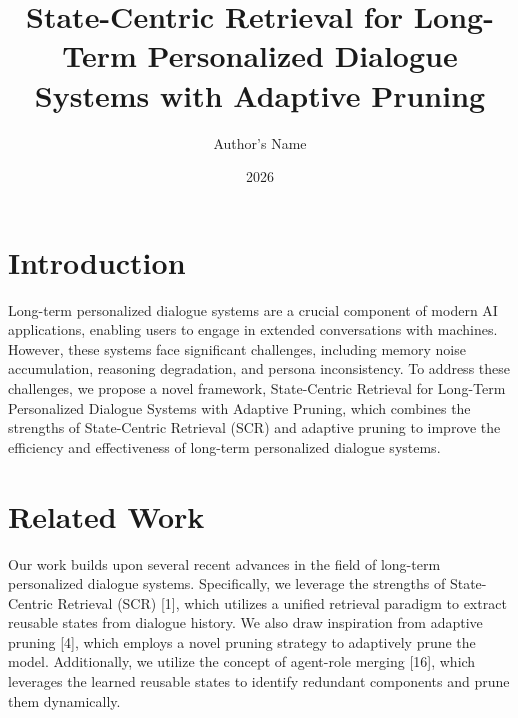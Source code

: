 \documentclass{article}
\title{State-Centric Retrieval for Long-Term Personalized Dialogue Systems with Adaptive Pruning}
\author{Author's Name}
\date{2026}
\begin{document}
\maketitle


\section{Introduction}

Long-term personalized dialogue systems are a crucial component of modern AI applications, enabling users to engage in extended conversations with machines. However, these systems face significant challenges, including memory noise accumulation, reasoning degradation, and persona inconsistency. To address these challenges, we propose a novel framework, State-Centric Retrieval for Long-Term Personalized Dialogue Systems with Adaptive Pruning, which combines the strengths of State-Centric Retrieval (SCR) and adaptive pruning to improve the efficiency and effectiveness of long-term personalized dialogue systems.

\section{Related Work}

Our work builds upon several recent advances in the field of long-term personalized dialogue systems. Specifically, we leverage the strengths of State-Centric Retrieval (SCR) [1], which utilizes a unified retrieval paradigm to extract reusable states from dialogue history. We also draw inspiration from adaptive pruning [4], which employs a novel pruning strategy to adaptively prune the model. Additionally, we utilize the concept of agent-role merging [16], which leverages the learned reusable states to identify redundant components and prune them dynamically.
\end{document}
